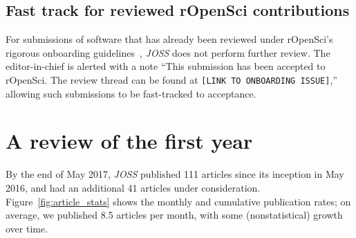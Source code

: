 \documentclass{article}
\newcommand\joss{\textit{JOSS}}
\begin{document}
\subsection{Fast track for reviewed rOpenSci contributions}

For submissions of software that has already been reviewed under rOpenSci's rigorous
onboarding guidelines~\cite{Ram:2016ws,Ram2017}, \joss{} does not perform
further review. The editor-in-chief is alerted with a note
``This submission has been accepted to rOpenSci. The review thread can be
found at \texttt{[LINK TO ONBOARDING ISSUE]},''  allowing such submissions to be fast-tracked to  acceptance.


\section{A review of the first year}\label{firstyear}

By the end of May 2017, \joss{} published 111 articles since its
inception in May 2016, and had an additional 41 articles under consideration.
Figure~\ref{fig:article_stats} shows the monthly and cumulative publication rates;
on average, we published 8.5 articles per month, with some (nonstatistical) growth over time.

\end{document}
